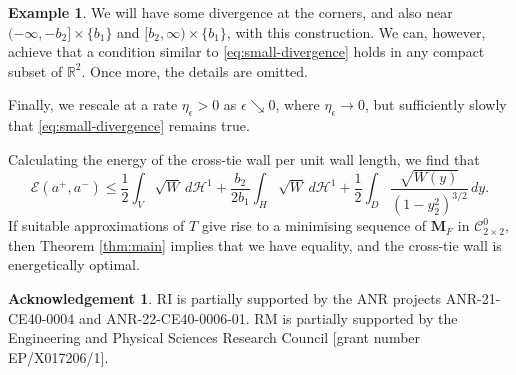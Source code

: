 \documentclass[a4paper]{article}
\newcommand{\R}{\mathbb{R}}
\newcommand{\Ha}{\mathcal{H}}
\newcommand{\M}{\mathbf{M}}
\newcommand{\ncrt}{\mathcal{C}}
\theoremstyle{definition}
\newtheorem{example}[theorem]{Example}
\newtheorem*{acknowledgement}{Acknowledgement}
\theoremstyle{remark}
\begin{document}
\begin{example}
We will have some divergence at the corners, and also near $(-\infty, -b_2] \times \{b_1\}$ and $[b_2, \infty) \times \{b_1\}$, with this construction.
We can, however, achieve that a condition similar to \eqref{eq:small-divergence} holds in any compact subset of $\R^2$. Once more, the details are omitted.

Finally, we rescale at a rate $\eta_\epsilon > 0$ as $\epsilon \searrow 0$,
where $\eta_\epsilon \to 0$, but sufficiently slowly that \eqref{eq:small-divergence} remains true.

Calculating the energy of the cross-tie wall per unit wall length, we find that
\[
\mathcal{E}(a^+, a^-) \le \frac{1}{2} \int_V \sqrt{W} \, d\Ha^1 + \frac{b_2}{2b_1} \int_H \sqrt{W} \, d\Ha^1 + \frac{1}{2} \int_D \frac{\sqrt{W(y)}}{(1 - y_2^2)^{3/2}} \, dy.
\]
If suitable approximations of $T$ give rise to a minimising sequence of $\M_F$ in $\ncrt_{2 \times 2}^0$, then Theorem \ref{thm:main}
implies that we have equality, and the cross-tie wall is energetically optimal.
\end{example}



\begin{acknowledgement}
RI is partially supported by the ANR projects ANR-21-CE40-0004 and ANR-22-CE40-0006-01. RM is partially supported by the Engineering and Physical Sciences Research Council [grant number EP/X017206/1].
\end{acknowledgement}
\end{document}
